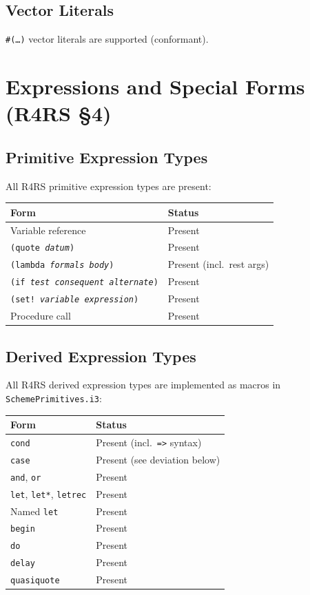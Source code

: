 \documentclass[12pt]{report}
\begin{document}
\section{Vector Literals}

{\tt \#(\ldots)} vector literals are supported (conformant).

\chapter{Expressions and Special Forms (R4RS \S4)}

\section{Primitive Expression Types}

All R4RS primitive expression types are present:

\begin{center}
\begin{tabular}{ll}
\toprule
\textbf{Form} & \textbf{Status} \\
\midrule
Variable reference & Present \\
{\tt (quote \emph{datum})} & Present \\
{\tt (lambda \emph{formals} \emph{body})} & Present (incl.\ rest args) \\
{\tt (if \emph{test} \emph{consequent} \emph{alternate})} & Present \\
{\tt (set!\ \emph{variable} \emph{expression})} & Present \\
Procedure call & Present \\
\bottomrule
\end{tabular}
\end{center}

\section{Derived Expression Types}

All R4RS derived expression types are implemented as macros in
{\tt SchemePrimitives.i3}:

\begin{center}
\begin{tabular}{ll}
\toprule
\textbf{Form} & \textbf{Status} \\
\midrule
{\tt cond} & Present (incl.\ {\tt =>} syntax) \\
{\tt case} & Present (see deviation below) \\
{\tt and}, {\tt or} & Present \\
{\tt let}, {\tt let*}, {\tt letrec} & Present \\
Named {\tt let} & Present \\
{\tt begin} & Present \\
{\tt do} & Present \\
{\tt delay} & Present \\
{\tt quasiquote} & Present \\
\bottomrule
\end{tabular}
\end{center}
\end{document}
